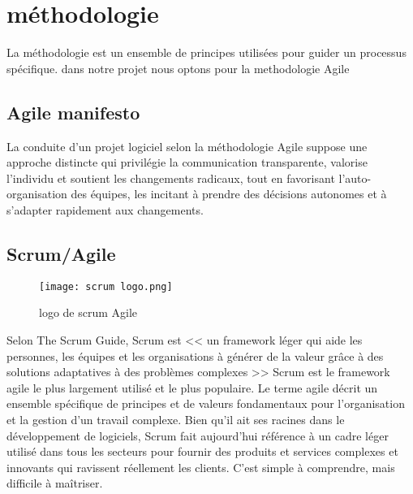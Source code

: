 \section{méthodologie}
La méthodologie est un ensemble de principes utilisées pour guider un processus spécifique. dans notre projet nous  optons pour la methodologie Agile
\subsection{Agile manifesto}
La conduite d'un projet logiciel selon la méthodologie Agile suppose une approche distincte qui privilégie la communication transparente, valorise l'individu et soutient les changements radicaux, tout en favorisant l'auto-organisation des équipes, les incitant à prendre des décisions autonomes et à s'adapter rapidement aux changements.

\subsection{Scrum/Agile}
\begin{wrapfigure}{r}{0.25\textwidth} 
    \centering
    \texttt{[image: scrum logo.png]}
    \caption{logo de scrum Agile}
\end{wrapfigure}
Selon The Scrum Guide\textsuperscript{\texttrademark}, Scrum est << un framework léger qui aide les personnes, les équipes et les organisations à générer de la valeur grâce à des solutions adaptatives à des problèmes complexes >> Scrum est le framework agile le plus largement utilisé et le plus populaire. Le terme agile décrit un ensemble spécifique de principes et de valeurs fondamentaux pour l'organisation et la gestion d'un travail complexe.
Bien qu'il ait ses racines dans le développement de logiciels, Scrum fait aujourd'hui référence à un cadre léger utilisé dans tous les secteurs pour fournir des produits et services complexes et innovants qui ravissent réellement les clients. C'est simple à comprendre, mais difficile à maîtriser.

